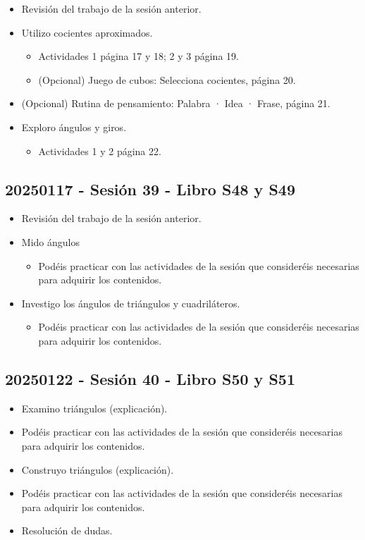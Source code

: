 \documentclass[a4paper,12pt]{article}
\begin{document}
\begin{itemize}
    \item Revisión del trabajo de la sesión anterior.
    \item Utilizo cocientes aproximados.
    \begin{itemize}
        \item Actividades 1 página 17 y 18; 2 y 3 página 19.
        \item (Opcional) Juego de cubos: Selecciona cocientes, página 20.
    \end{itemize}
    \item (Opcional) Rutina de pensamiento: Palabra · Idea · Frase, página 21.
    \item Exploro ángulos y giros.
    \begin{itemize}
        \item Actividades 1 y 2 página 22.
    \end{itemize}
\end{itemize}

\subsection{20250117 - Sesión 39 - Libro S48 y S49}

\begin{itemize}
    \item Revisión del trabajo de la sesión anterior.
    \item Mido ángulos
    \begin{itemize}
        \item Podéis practicar con las actividades de la sesión que consideréis necesarias para adquirir los contenidos.
    \end{itemize}
    \item Investigo los ángulos de triángulos y cuadriláteros.
    \begin{itemize}
        \item Podéis practicar con las actividades de la sesión que consideréis necesarias para adquirir los contenidos.
    \end{itemize}
\end{itemize}

\subsection{20250122 - Sesión 40 - Libro S50 y S51}

\begin{itemize}
    \item Examino triángulos (explicación).
    \item Podéis practicar con las actividades de la sesión que consideréis necesarias para adquirir los contenidos.
    \item Construyo triángulos (explicación).
    \item Podéis practicar con las actividades de la sesión que consideréis necesarias para adquirir los contenidos.
    \item Resolución de dudas.
\end{itemize}
\end{document}
